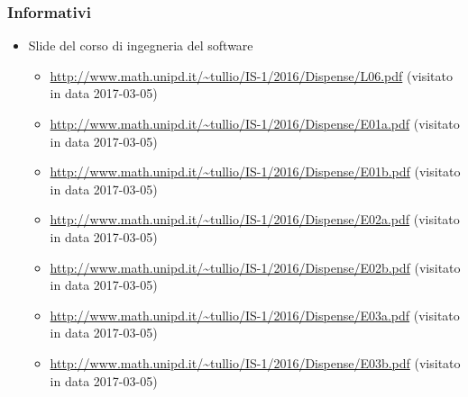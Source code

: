  \subsubsection{Informativi}
    \begin{itemize}
    	\item Slide del corso di ingegneria del software
    	\begin{itemize}
    		\item \url{http://www.math.unipd.it/~tullio/IS-1/2016/Dispense/L06.pdf} (visitato in data 2017-03-05)
    		\item \url{http://www.math.unipd.it/~tullio/IS-1/2016/Dispense/E01a.pdf} (visitato in data 2017-03-05)
    		\item \url{http://www.math.unipd.it/~tullio/IS-1/2016/Dispense/E01b.pdf} (visitato in data 2017-03-05)
    		\item \url{http://www.math.unipd.it/~tullio/IS-1/2016/Dispense/E02a.pdf} (visitato in data 2017-03-05)
    		\item \url{http://www.math.unipd.it/~tullio/IS-1/2016/Dispense/E02b.pdf} (visitato in data 2017-03-05)
    		\item \url{http://www.math.unipd.it/~tullio/IS-1/2016/Dispense/E03a.pdf} (visitato in data 2017-03-05)
    		\item \url{http://www.math.unipd.it/~tullio/IS-1/2016/Dispense/E03b.pdf} (visitato in data 2017-03-05)
    	\end{itemize}
    \end{itemize}